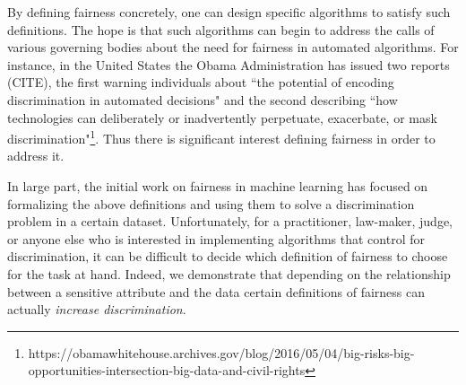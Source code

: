 By defining fairness concretely, one can design specific algorithms to satisfy such definitions. The hope is that such algorithms can begin to address the calls of various governing bodies about the need for fairness in automated algorithms. For instance, in the United States the Obama Administration has issued two reports (CITE), the first warning individuals about ``the potential of encoding discrimination in automated decisions" and the second describing ``how technologies can deliberately or inadvertently perpetuate, exacerbate, or mask discrimination"\footnote{https://obamawhitehouse.archives.gov/blog/2016/05/04/big-risks-big-opportunities-intersection-big-data-and-civil-rights}. Thus there is significant interest defining fairness in order to address it.

In large part, the initial work on fairness in machine learning has focused on formalizing the above definitions and using them to solve a discrimination problem in a certain dataset. Unfortunately, for a practitioner, law-maker, judge, or anyone else who is interested in implementing algorithms that control for discrimination, it can be difficult to decide which definition of fairness to choose for the task at hand. Indeed, we demonstrate that depending on the relationship between a sensitive attribute and the data certain definitions of fairness can actually \emph{increase discrimination}.

% 

